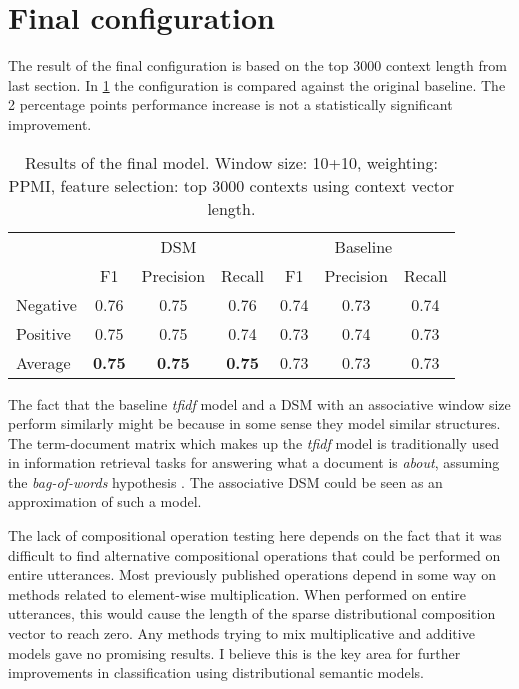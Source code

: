 \section{Final configuration}

The result of the final configuration is based on the top 3000 context length from last section. In \cref{tbl:final-results} the configuration is compared against the original baseline. The 2 percentage points performance increase is not a statistically significant improvement.

\begin{table}[H]
\centering
\begin{tabular}{lccc|ccc}
\cline{2-7}
~ & \multicolumn{3}{c|}{DSM} & \multicolumn{3}{c}{Baseline} \\
\cline{2-7}
~        & \multicolumn{1}{c}{F1} & \multicolumn{1}{c}{Precision} & \multicolumn{1}{c|}{Recall}  & \multicolumn{1}{c}{F1} & \multicolumn{1}{c}{Precision}
 & \multicolumn{1}{c}{Recall} \\
\cline{2-7}
Negative     & 0.76 & 0.75  & 0.76 & 0.74     & 0.73      & 0.74   \\
Positive     & 0.75 & 0.75  & 0.74 & 0.73     & 0.74      & 0.73   \\
Average & \textbf{0.75} & \textbf{0.75}  & \textbf{0.75} & 0.73     & 0.73      & 0.73   \\
\cline{2-7}
\end{tabular}
    \caption{Results of the final model. Window size: 10+10, weighting: PPMI, feature selection: top 3000 contexts using context vector length.}
    \label{tbl:final-results}
\end{table}

The fact that the baseline \emph{tfidf} model and a DSM with an associative window size perform similarly might be because in some sense they model similar structures. The term-document matrix which makes up the \emph{tfidf} model is traditionally used in information retrieval tasks for answering what a document is \emph{about}, assuming the \emph{bag-of-words} hypothesis \parencite{Turney2010From}. The associative DSM could be seen as an approximation of such a model.

The lack of compositional operation testing here depends on the fact that it was difficult to find alternative compositional operations that could be performed on entire utterances. Most previously published operations depend in some way on methods related to element-wise multiplication. When performed on entire utterances, this would cause the length of the sparse distributional composition vector to reach zero. Any methods trying to mix multiplicative and additive models gave no promising results. I believe this is the key area for further improvements in classification using distributional semantic models.

